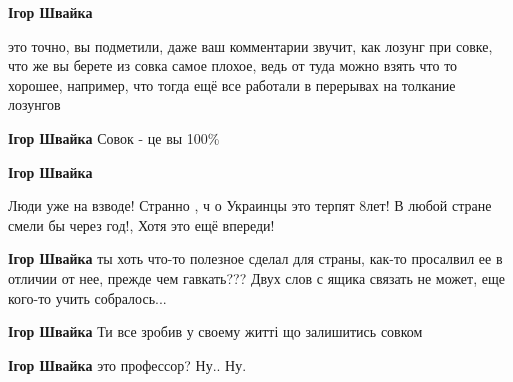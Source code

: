 \begin{itemize}
\begin{itemize}
\textbf{Ігор Швайка} 

это точно, вы подметили, даже ваш комментарии звучит, как лозунг при совке, что
же вы берете из совка самое плохое, ведь от туда можно взять что то хорошее,
например, что тогда ещё все работали в перерывах на толкание лозунгов

 
\textbf{Ігор Швайка} Совок - це вы 100\%

 
\textbf{Ігор Швайка}

Люди уже на взводе! Странно , ч о Украинцы это терпят 8лет! В любой стране
смели бы через год!, Хотя это ещё впереди!


 
\textbf{Ігор Швайка} ты хоть что-то полезное сделал для страны, как-то
просалвил ее в отличии от нее, прежде чем гавкать??? Двух слов с ящика связать
не может, еще кого-то учить собралось...

 
\textbf{Ігор Швайка} Ти все зробив у своему житті що залишитись совком

 
\textbf{Ігор Швайка} это профессор? Ну.. Ну.

 

\end{itemize}
\end{itemize}
